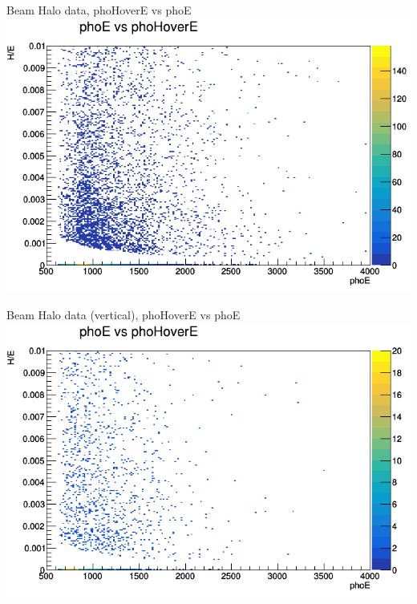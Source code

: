 \documentclass{beamer}
\begin{document}
\begin{frame}{Beam Halo data, phoHoverE vs phoE}
    \includegraphics[width=\linewidth]{phoE_vs_phoHoverE_anTGCtree_data_beamhalo.png}
\end{frame}
\begin{frame}{Beam Halo data (vertical), phoHoverE vs phoE}
    \includegraphics[width=\linewidth]{phoE_vs_phoHoverE_anTGCtree_data_bhvertical.png}
\end{frame}{}
\end{document}
